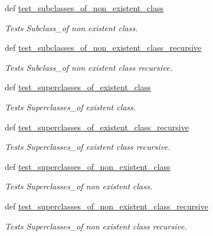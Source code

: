 \begin{DoxyCompactItemize}
def \hyperlink{classsub__super__class__functional__tests_1_1OntologyFunc_a6768c2b4e4e8719a7db60df239af79c0}{test\-\_\-subclasses\-\_\-of\-\_\-non\-\_\-existent\-\_\-class}
\begin{DoxyCompactList}\small\item\em Tests Subclass\-\_\-of non existent class. \end{DoxyCompactList}\item 
def \hyperlink{classsub__super__class__functional__tests_1_1OntologyFunc_a93c10dafecd28a1a4ff9eec8c378e077}{test\-\_\-subclasses\-\_\-of\-\_\-non\-\_\-existent\-\_\-class\-\_\-recursive}
\begin{DoxyCompactList}\small\item\em Tests Subclass\-\_\-of non existent class recursive. \end{DoxyCompactList}\item 
def \hyperlink{classsub__super__class__functional__tests_1_1OntologyFunc_a7360ce5fe52a6f35f2c0a898d107d4d0}{test\-\_\-superclasses\-\_\-of\-\_\-existent\-\_\-class}
\begin{DoxyCompactList}\small\item\em Tests Superclasses\-\_\-of existent class. \end{DoxyCompactList}\item 
def \hyperlink{classsub__super__class__functional__tests_1_1OntologyFunc_a025f65f6a489c34f3875e6d2ab2a88fe}{test\-\_\-superclasses\-\_\-of\-\_\-existent\-\_\-class\-\_\-recursive}
\begin{DoxyCompactList}\small\item\em Tests Superclasses\-\_\-of existent class recursive. \end{DoxyCompactList}\item 
def \hyperlink{classsub__super__class__functional__tests_1_1OntologyFunc_a09984a286cd36ff5b6837874d8647c76}{test\-\_\-superclasses\-\_\-of\-\_\-non\-\_\-existent\-\_\-class}
\begin{DoxyCompactList}\small\item\em Tests Superclasses\-\_\-of non existent class. \end{DoxyCompactList}\item 
def \hyperlink{classsub__super__class__functional__tests_1_1OntologyFunc_a9865ddee876956c29db019d48cd94530}{test\-\_\-superclasses\-\_\-of\-\_\-non\-\_\-existent\-\_\-class\-\_\-recursive}
\begin{DoxyCompactList}\small\item\em Tests Superclasses\-\_\-of non existent class recursive. \end{DoxyCompactList}\end{DoxyCompactItemize}


